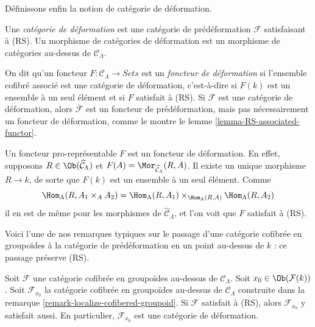 \noindent
Définissons enfin la notion de catégorie de déformation.

\begin{definition}
\label{definition-deformation-category}
Une {\it catégorie de déformation} est une catégorie de prédéformation
$\mathcal{F}$ satisfaisant à (RS). Un morphisme de catégories de déformation
est un morphisme de catégories au-dessus de $\mathcal{C}_\Lambda$.
\end{definition}

\begin{remark}
\label{remark-deformation-functor}
On dit qu'un foncteur $F: \mathcal{C}_\Lambda \to \textit{Sets}$ est un
{\it foncteur de déformation} si l'ensemble cofibré associé est une catégorie
de déformation, c'est-à-dire si $F(k)$ est un ensemble à un seul élément et si $F$
satisfait à (RS). Si $\mathcal{F}$ est une catégorie de déformation, alors
$\overline{\mathcal{F}}$ est un foncteur de prédéformation, mais pas
nécessairement un foncteur de déformation, comme le montre le lemme
\ref{lemma-RS-associated-functor}.
\end{remark}

\begin{example}
\label{example-prorepresentable-deformation-functor}
Un foncteur pro-représentable $F$ est un foncteur de déformation. En effet,
supposons $R \in \Ob(\widehat{\mathcal{C}}_\Lambda)$ et
$F(A) = \Mor_{\widehat{\mathcal{C}}_\Lambda}(R, A)$. Il existe un unique
morphisme $R \to k$, de sorte que $F(k)$ est un ensemble à un seul élément. Comme
$$
\Hom_\Lambda(R, A_1 \times_A A_2) =
\Hom_\Lambda(R, A_1) \times_{\Hom_\Lambda(R, A)}
\Hom_\Lambda(R, A_2)
$$
il en est de même pour les morphismes de $\widehat{\mathcal{C}}_\Lambda$, et
l'on voit que $F$ satisfait à (RS).
\end{example}

\noindent
Voici l'une de nos remarques typiques sur le passage d'une catégorie cofibrée
en groupoïdes à la catégorie de prédéformation en un point au-dessus de $k$ :
ce passage préserve (RS).

\begin{lemma}
\label{lemma-localize-RS}
Soit $\mathcal{F}$ une catégorie cofibrée en groupoïdes au-dessus de
$\mathcal{C}_\Lambda$. Soit $x_0 \in \Ob(\mathcal{F}(k))$. Soit
$\mathcal{F}_{x_0}$ la catégorie cofibrée en groupoïdes au-dessus de
$\mathcal{C}_\Lambda$ construite dans la remarque
\ref{remark-localize-cofibered-groupoid}. Si $\mathcal{F}$ satisfait à (RS),
alors $\mathcal{F}_{x_0}$ y satisfait aussi. En particulier,
$\mathcal{F}_{x_0}$ est une catégorie de déformation.
\end{lemma}

